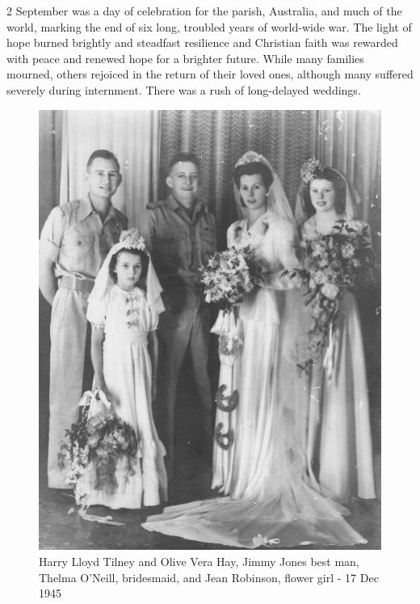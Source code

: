 2 September was a day of celebration for the parish, Australia, and much of the world, marking the end of six long, troubled years of world-wide war. The light of hope burned brightly and steadfast resilience and Christian faith was rewarded with peace and renewed hope for a brighter future. While many families mourned, others rejoiced in the return of their loved ones, although many suffered severely during internment. There was a rush of long-delayed weddings.









\begin{figure}
\begin{center}
\includegraphics[width=1.\linewidth,center]{../images/OliveAndSnowTilneyWedding17121945.jpg}
\caption{Harry Lloyd Tilney and Olive Vera Hay, Jimmy Jones best man, Thelma O'Neill, bridesmaid, and Jean Robinson, flower girl - 17 Dec 1945}
\end{center}
\end{figure}




